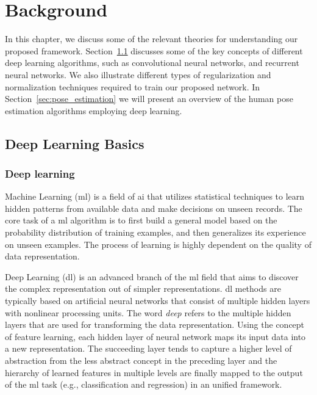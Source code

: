 \chapter{Background}\label{ch:background}
In this chapter, we discuss some of the relevant theories for understanding our proposed framework. Section~\ref{sec:deep_learning_basics} discusses some of the key concepts of different deep learning algorithms, such as convolutional neural networks, and recurrent neural networks. We also illustrate different types of regularization and normalization techniques required to train our proposed network. In Section~\ref{sec:pose_estimation} we will present an overview of the human pose estimation algorithms employing deep learning. 


\section{Deep Learning Basics} \label{sec:deep_learning_basics}
\subsection{Deep learning}
Machine Learning (\gls{ml}) is a field of \gls{ai} that utilizes statistical techniques to learn hidden patterns from available data and make decisions on unseen records. The core task of a \gls{ml} algorithm is to first build a general model based on the probability distribution of training examples, and then generalizes its experience on unseen examples. The process of learning is highly dependent on the quality of data representation.

Deep Learning (\gls{dl}) is an advanced branch of the \gls{ml} field that aims to discover the complex representation out of simpler representations. \gls{dl} methods are typically based on artificial neural networks that consist of multiple hidden layers with nonlinear processing units. The word \textit{deep} refers to the multiple hidden layers that are used for transforming the data representation. Using the concept of feature learning, each hidden layer of neural network maps its input data into a new representation. The succeeding layer tends to capture a higher level of abstraction from the less abstract concept in the preceding layer and the hierarchy of learned features in multiple levels are finally mapped to the output of the \gls{ml} task (e.g., classification and regression) in an unified framework.


